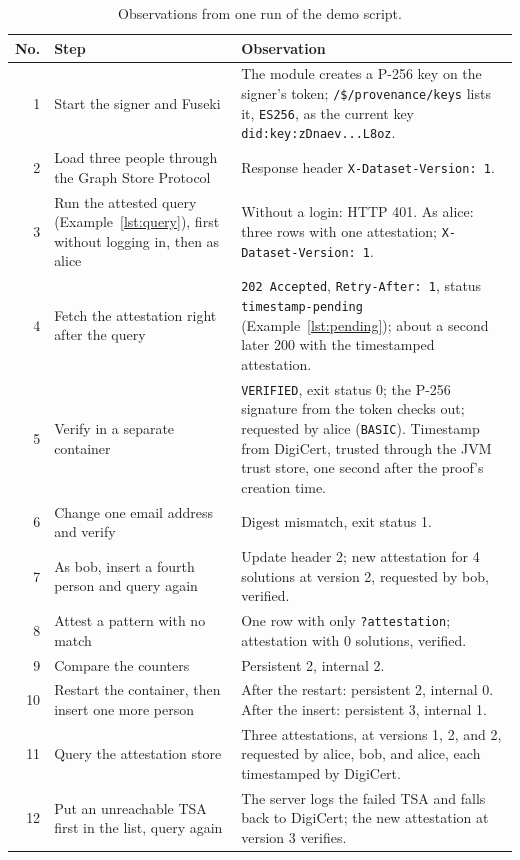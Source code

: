 \documentclass[11pt,a4paper]{article}
\newcommand{\code}[1]{\texttt{#1}}
\begin{document}
\begin{table}[htbp]
\centering
\caption{Observations from one run of the demo script.}
\label{tab:demo}
\small
\begin{tabularx}{\linewidth}{@{}r>{\raggedright\arraybackslash}p{52mm}>{\raggedright\arraybackslash}X@{}}
\toprule
No. & Step & Observation \\
\midrule
1 & Start the signer and Fuseki & The module creates a P-256 key on the signer's token;
\code{/\$/provenance/keys} lists it, \code{ES256}, as the current key
\code{did:key:zDnaev...L8oz}. \\
2 & Load three people through the Graph Store Protocol & Response header
\code{X-Dataset-Version: 1}. \\
3 & Run the attested query (Example~\ref{lst:query}), first without logging in, then as
alice & Without a login: HTTP 401. As alice: three rows with one attestation;
\code{X-Dataset-Version: 1}. \\
4 & Fetch the attestation right after the query & \code{202 Accepted},
\code{Retry-After: 1}, status \code{timestamp-pending} (Example~\ref{lst:pending}); about a
second later 200 with the timestamped attestation. \\
5 & Verify in a separate container & \code{VERIFIED}, exit status 0; the P-256 signature
from the token checks out; requested by alice (\code{BASIC}). Timestamp from
DigiCert, trusted through the JVM trust store, one second after the proof's creation
time. \\
6 & Change one email address and verify & Digest mismatch, exit status 1. \\
7 & As bob, insert a fourth person and query again & Update header 2; new attestation for 4
solutions at version 2, requested by bob, verified. \\
8 & Attest a pattern with no match & One row with only \code{?attestation}; attestation with 0
solutions, verified. \\
9 & Compare the counters & Persistent 2, internal 2. \\
10 & Restart the container, then insert one more person & After the restart: persistent 2,
internal 0. After the insert: persistent 3, internal 1. \\
11 & Query the attestation store & Three attestations, at versions 1, 2, and 2, requested by
alice, bob, and alice, each timestamped by DigiCert. \\
12 & Put an unreachable TSA first in the list, query again & The server logs the failed TSA
and falls back to DigiCert; the new attestation at version 3 verifies. \\

\end{tabularx}
\end{table}
\end{document}

